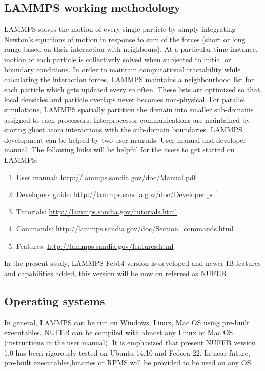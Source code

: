 \documentclass[11pt,a4paper,openright]{article}
\begin{document}
\subsection{LAMMPS working methodology}
LAMMPS solves the motion of every single particle by simply integrating Newton's equations of motion in response to sum of the forces (short or long range based on their interaction with neighbours). At a particular time instance, motion of each particle is collectively solved when subjected to initial or boundary conditions. In order to maintain computational tractability while calculating the interaction forces, LAMMPS maintains a neighbourhood list for each particle which gets updated every so often. These lists are optimized so that local densities and particle overlaps never becomes non-physical. For parallel simulations, LAMMPS spatially partition the domain into smaller sub-domains assigned to each processors. Interprocessor communications are maintained by storing ghost atom interactions with the sub-domain boundaries. LAMMPS development can be helped by two user manuals: User manual and developer manual. The following links will be helpful for the users to get started on LAMMPS:

\begin{enumerate}
\item User manual: \url{http://lammps.sandia.gov/doc/Manual.pdf}
\item Developers guide: \url{http://lammps.sandia.gov/doc/Developer.pdf}
\item Tutorials: \url{http://lammps.sandia.gov/tutorials.html}
\item Commands: \url{http://lammps.sandia.gov/doc/Section_commands.html}
\item Features: \url{http://lammps.sandia.gov/features.html}
\end{enumerate}

In the present study, LAMMPS-Feb14 version is developed and newer IB features and capabilities added, this version will be now on referred as NUFEB. 

\subsection{Operating systems}
In general, LAMMPS can be run on Windows, Linux, Mac OS using pre-built executables. NUFEB can be compiled with almost any Linux or Mac OS (instructions in the user manual). It is emphasized that present NUFEB version 1.0 has been rigorously tested on Ubuntu-14.10 and Fedora-22. In near future, pre-built executables,binaries or RPMS will be provided to be used on any OS.
\end{document}
